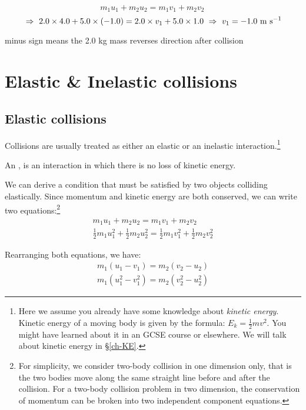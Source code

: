 \begin{soln}\begin{equation*}
m_1 u_1 + m_2 u_2 = m_1 v_1 + m_2 v_2 \, 
\end{equation*}
\begin{equation*}
\, \Rightarrow \, \, 2.0\times4.0+5.0\times(-1.0) = 2.0 \times v_1 + 5.0\times1.0 \, \, \Rightarrow \, \,  v_1 = -1.0 \text{ m s$^{-1}$}
\end{equation*}

minus sign means the 2.0 kg mass reverses direction after collision \end{soln}

\section{Elastic \& Inelastic collisions}

\subsection*{Elastic collisions}

Collisions are usually treated as either an elastic or an inelastic interaction.\footnote{Here we assume you already have some knowledge about \emph{kinetic energy}. Kinetic energy of a moving body is given by the formula: $E_k = \frac{1}{2}mv^2$. You might have learned about it in an GCSE course or elsewhere. We will talk about kinetic energy in \S\ref{ch-KE}.}

\begin{ilight}
	An , is an interaction in which there is no loss of kinetic energy.
\end{ilight}

We can derive a condition that must be satisfied by two objects colliding elastically. Since momentum and kinetic energy are both conserved, we can write two equations:\footnote{For simplicity, we consider two-body collision in one dimension only, that is the two bodies move along the same straight line before and after the collision. For a two-body collision problem in two dimension, the conservation of momentum can be broken into two independent component equations.}
\begin{gather*}
	{ m_1 u_1 + m_2 u_2 = m_1 v_1 + m_2 v_2 }\\
	{ \frac{1}{2}m_1 u_1^2 + \frac{1}{2}m_2 u_2^2 = \frac{1}{2}m_1 v_1^2 + \frac{1}{2}m_2 v_2^2  }
\end{gather*}

Rearranging both equations, we have:
\begin{gather}
m_1 (u_1 - v_1) = m_2 (v_2 - u_2) \tag{1}\\
m_1 (u_1^2 - v_1^2) = m_2 (v_2^2 - u_2^2)  \tag{2}
\end{gather}

